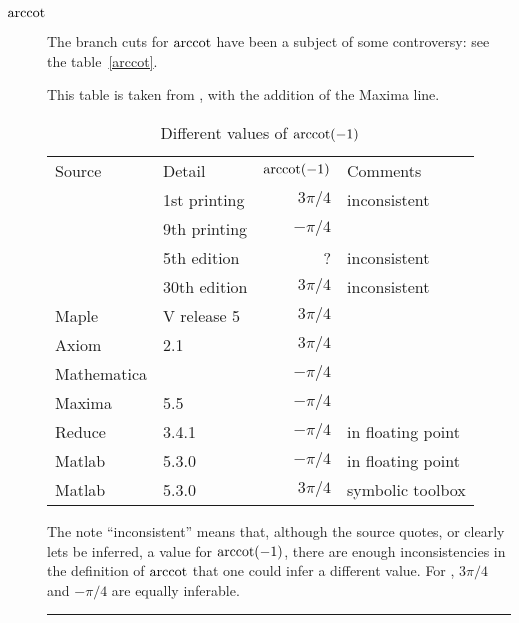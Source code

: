 \documentclass[report,keylogo]{openmath}
\begin{document}
\begin{description}
\item[$\mathop{\rm arccot}$]The branch cuts for $\mathop{\rm arccot}$ have been a subject of some
controversy: see the table~\ref{arccot}.\begin{table}[t]

\vspace*{-\baselineskip}
\small

\caption{Different values of $\mathop{\rm arccot}(-1)$}
This table is taken from \cite{CDJW}, with the addition of the Maxima line.
\par\noindent
\begin{tabular}{llrl}
Source&Detail&$\mathop{\rm arccot}(-1)$&Comments\\
\cite{AS}&1st printing&$3\pi/4$&inconsistent\\
\cite{AS}&9th printing&$-\pi/4$\\
\cite{GR}&5th edition&?&inconsistent\\
\cite{CRC}&30th edition&$3\pi/4$&inconsistent\\
Maple&V release 5&$3\pi/4$\\
Axiom&2.1&$3\pi/4$\\
Mathematica&\cite{Mma}&$-\pi/4$\\
Maxima&5.5&$-\pi/4$\\
Reduce&3.4.1&$-\pi/4$&in floating point\\
Matlab&5.3.0&$-\pi/4$&in floating point\\
Matlab&5.3.0&$3\pi/4$&symbolic toolbox
\end{tabular}


\noindent
The note ``inconsistent'' means that, although the source quotes, or
clearly lets be inferred, a value for $\mathop{\rm arccot}(-1)$, there are enough
inconsistencies in the definition of $\mathop{\rm arccot}$ that one could infer a
different value. For \cite{GR}, $3\pi/4$ and $-\pi/4$ are equally
inferable.

\smallskip

\hrule


\end{table}
\end{description}
\end{document}

